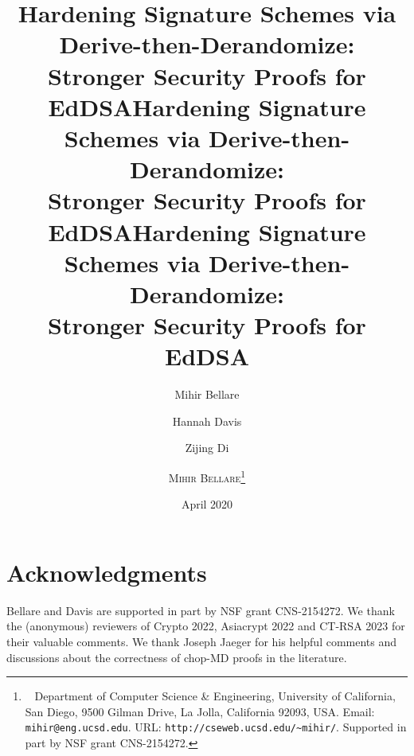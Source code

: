 \ifacm \documentclass{sig-alternate}
\makeatletter
\def\BellareEmail{\tt mihir@eng.ucsd.edu}
\def\BellareWebpage{\tt http://cseweb.ucsd.edu/\textasciitilde mihir/}
\def\BellareDept{Department of Computer Science \& Engineering}
\def\BellareCompany{University of California, San Diego}
\def\BellareAddress{9500 Gilman Drive, La Jolla, California 92093, USA}
\def\BellareThanks{
\BellareDept,
\BellareCompany,
\BellareAddress.
Email: {\tt \BellareEmail}.
URL: {\tt \BellareWebpage}.
Supported in part by NSF grant CNS-2154272.
}
\newcommand{\titletext}{Hardening Signature Schemes via Derive-then-Derandomize: \\
Stronger Security Proofs for EdDSA}
\makeatother
\begin{document}
\setlength{\abovedisplayskip}{2pt}
\setlength{\belowdisplayskip}{2pt}
\setlength{\abovedisplayshortskip}{0pt}
\setlength{\belowdisplayshortskip}{2pt}




\ifllncs
\ifanonymous
\author{}
\institute{}
\title{\titletext}
\else
\title{\titletext}
\author{Mihir Bellare \and Hannah Davis \and Zijing Di}
\fi  %

\else %
\ifacm

\else %
\title{\textbf{\titletext\protect\vspace{0.3in}}}
\appearsin{}
\author{\textsc{Mihir Bellare}\thanks{\ \BellareThanks}\vspace{0.3in}}
\date{April 2020\vspace{0.2in}}
\fi %
\fi %

\maketitle


\begin{abstract}


\ifllncs\ifanonymous{}\fi\fi 
\end{abstract}

\ifacm\else\ifllncs\else
\newpage
\tableofcontents
\newpage
\fi\fi





%
%



%

%
%

\ifllncs

\section*{Acknowledgments}

\ifllncs Bellare and Davis are supported in part by NSF grant CNS-2154272. \fi We thank the (anonymous) reviewers of Crypto 2022, Asiacrypt 2022 and CT-RSA 2023 for their valuable comments.
We thank Joseph Jaeger for his helpful comments and discussions about the correctness of chop-MD proofs in the literature.
\end{document}
